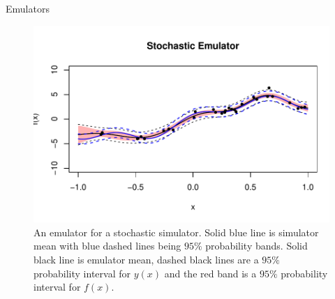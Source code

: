 \begin{chapter}{Emulators \label{Ch:Emulators}}
\begin{figure}[h]
  \centering
  \includegraphics[width = \textwidth]{fig-emulators/toy-stoch.pdf}
  \caption{An emulator for a stochastic simulator. Solid blue line is simulator mean with blue dashed lines being $95\%$ probability bands. Solid black line is emulator mean, dashed black lines are a $95\%$ probability interval for $y(x)$ and the red band is a $95\%$ probability interval for $f(x)$.}
  \label{Fig:toy-stoch}
\end{figure}

\end{chapter}
